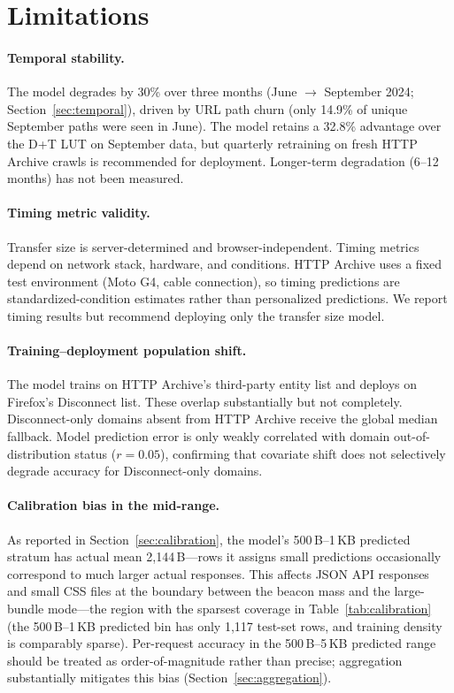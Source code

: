 \documentclass[sigconf,nonacm]{acmart}
\begin{document}
\section{Limitations}
\label{sec:limitations}

\paragraph{Temporal stability.}
The model degrades by 30\% over three months (June $\to$ September 2024; Section~\ref{sec:temporal}), driven by URL path churn (only 14.9\% of unique September paths were seen in June).
The model retains a 32.8\% advantage over the D+T LUT on September data, but quarterly retraining on fresh HTTP Archive crawls is recommended for deployment.
Longer-term degradation (6--12 months) has not been measured.

\paragraph{Timing metric validity.}
Transfer size is server-determined and browser-independent.
Timing metrics depend on network stack, hardware, and conditions.
HTTP Archive uses a fixed test environment (Moto G4, cable connection), so timing predictions are standardized-condition estimates rather than personalized predictions.
We report timing results but recommend deploying only the transfer size model.

\paragraph{Training--deployment population shift.}
The model trains on HTTP Archive's third-party entity list and deploys on Firefox's Disconnect list.
These overlap substantially but not completely.
Disconnect-only domains absent from HTTP Archive receive the global median fallback.
Model prediction error is only weakly correlated with domain out-of-distribution status ($r = 0.05$), confirming that covariate shift does not selectively degrade accuracy for Disconnect-only domains.

\paragraph{Calibration bias in the mid-range.}
As reported in Section~\ref{sec:calibration}, the model's 500\,B--1\,KB predicted stratum has actual mean 2,144\,B---rows it assigns small predictions occasionally correspond to much larger actual responses.
This affects JSON API responses and small CSS files at the boundary between the beacon mass and the large-bundle mode---the region with the sparsest coverage in Table~\ref{tab:calibration} (the 500\,B--1\,KB predicted bin has only 1{,}117 test-set rows, and training density is comparably sparse).
Per-request accuracy in the 500\,B--5\,KB predicted range should be treated as order-of-magnitude rather than precise; aggregation substantially mitigates this bias (Section~\ref{sec:aggregation}).
\end{document}
